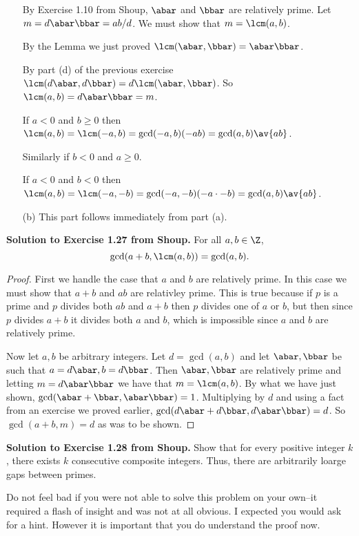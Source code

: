 \documentclass[oneside,12pt]{amsart}
\begin{document}
\begin{enumerate}
By Exercise 1.10 from Shoup, $\abar$ and $\bbar$ are relatively prime.
Let $m=d\abar\bbar = ab/d$. We must show that $m=\lcm(a,b)$.

By the Lemma we just proved $\lcm(\abar,\bbar) = \abar \bbar$.

By part (d) of the previous exercise $\lcm(d\abar,d\bbar) = d\lcm(\abar,\bbar)$.
So $\lcm(a,b) = d\abar\bbar=m$.

If $a<0$ and $b\geq 0$ then $\lcm(a,b) = \lcm(-a,b) = \gcd(-a,b) (-ab) = \gcd(a,b) \av{ab}$.

Similarly if $b<0$ and $a\geq 0$.

If $a<0$ and $b<0$ then $\lcm(a,b) = \lcm(-a,-b) = \gcd(-a,-b) (-a\cdot -b) = \gcd(a,b) \av{ab}$.

\item[(b)] This part follows immediately from part (a).
\end{enumerate}

\bigskip

\textbf{Solution to Exercise 1.27 from Shoup.} For all $a,b\in\Z$,
$$\gcd(a+b,\lcm(a,b)) = \gcd(a,b).$$
\begin{proof}
First we handle the case that $a$ and $b$ are relatively prime. In this case we must show that
$a+b$ and $ab$ are relativley prime. This is true because if $p$ is a prime and $p$ divides
both $ab$ and $a+b$ then $p$ divides one of $a$ or $b$, but then since $p$ divides $a+b$ it
divides both $a$ and $b$, which is impossible since $a$ and $b$ are relatively prime.

Now let $a,b$ be arbitrary integers. Let $d=\gcd(a,b)$ and let $\abar,\bbar$ be such that
$a=d\abar,b=d\bbar$. Then $\abar,\bbar$ are relatively prime and letting $m=d\abar\bbar$ we have
that $m=\lcm(a,b)$. By what we have just shown,
$\gcd(\abar+\bbar,\abar\bbar) = 1$. Multiplying by $d$ and using a fact from an exercise we proved earlier,
$\gcd(d\abar+d\bbar,d\abar\bbar)=d$. So $\gcd(a+b,m)=d$ as was to be shown.
\end{proof}

\bigskip

\textbf{Solution to Exercise 1.28 from Shoup.} Show that for every positive integer $k$, there exists $k$
consecutive composite integers. Thus, there are arbitrarily loarge gaps
between primes.

\begin{note}
Do not feel bad if you were not able to solve this problem on your own--it required a flash of insight and
was not at all obvious. I expected you would ask for a hint. However it is important that you do understand
the proof now.
\end{note}
\end{document}
